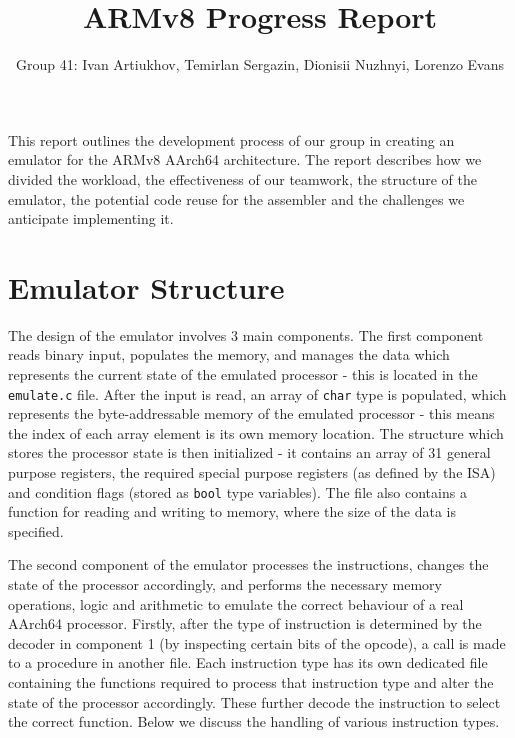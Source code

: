 \documentclass[11pt, oneside, USenglish]{article}
\title{\vspace{-2cm}ARMv8 Progress Report}
\author{Group 41: Ivan Artiukhov, Temirlan Sergazin, Dionisii Nuzhnyi, Lorenzo Evans}
\date{}
\begin{document}
\maketitle

This report outlines the development process of our group in creating an emulator for the ARMv8 AArch64 architecture.
The report describes how we divided the workload, the effectiveness of our teamwork, the structure of the emulator, the potential code reuse for the assembler and the challenges we anticipate implementing it.

\section{Emulator Structure}
The design of the emulator involves 3 main components.
The first component reads binary input, populates the memory, and manages the data which represents the current state of the emulated processor - this is located in the \verb|emulate.c| file. 
After the input is read, an array of \verb|char| type is populated, which represents the byte-addressable memory of the emulated processor - this means the index of each array element is its own memory location.
The structure which stores the processor state is then initialized - it contains an array of 31 general purpose registers, the required special purpose registers (as defined by the ISA) and condition flags (stored as \verb|bool| type variables).
The file also contains a function for reading and writing to memory, where the size of the data is specified.

The second component of the emulator processes the instructions, changes the state of the processor accordingly, and performs the necessary memory operations, logic and arithmetic to emulate the correct behaviour of a real AArch64 processor.
Firstly, after the type of instruction is determined by the decoder in component 1 (by inspecting certain bits of the opcode), a call is made to a procedure in another file. 
Each instruction type has its own dedicated file containing the functions required to process that instruction type and alter the state of the processor accordingly. These further decode the instruction to select the correct function. Below we discuss the handling of various instruction types.
\end{document}

